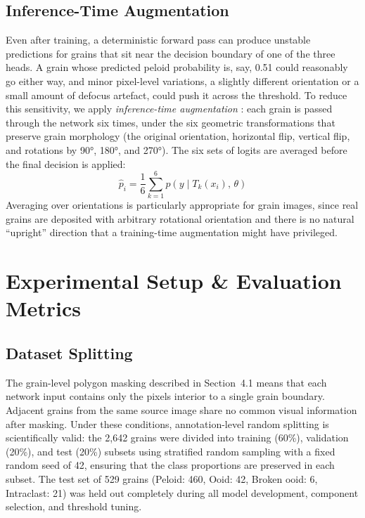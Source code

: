 \documentclass[a4paper,fleqn]{cas-dc}
\begin{document}
\subsection{Inference-Time Augmentation}
\label{sec:tta}
Even after training, a deterministic forward pass can produce unstable predictions for grains that sit near the decision boundary of one of the three heads. A grain whose predicted peloid probability is, say, 0.51 could reasonably go either way, and minor pixel-level variations, a slightly different orientation or a small amount of defocus artefact, could push it across the threshold. To reduce this sensitivity, we apply \textit{inference-time augmentation} \citep{shanmugam2021tta}: each grain is passed through the network six times, under the six geometric transformations that preserve grain morphology (the original orientation, horizontal flip, vertical flip, and rotations by 90°, 180°, and 270°). The six sets of logits are averaged before the final decision is applied:
\begin{equation}
\hat{p}_i = \frac{1}{6}\sum_{k=1}^{6} p\!\left(y \mid T_k(x_i),\, \theta\right)
\end{equation}
Averaging over orientations is particularly appropriate for grain images, since real grains are deposited with arbitrary rotational orientation and there is no natural ``upright'' direction that a training-time augmentation might have privileged.

\section{Experimental Setup \& Evaluation Metrics}

\subsection{Dataset Splitting}
The grain-level polygon masking described in Section~4.1 means that each network input contains only the pixels interior to a single grain boundary. Adjacent grains from the same source image share no common visual information after masking. Under these conditions, annotation-level random splitting is scientifically valid: the 2,642 grains were divided into training (60\%), validation (20\%), and test (20\%) subsets using stratified random sampling with a fixed random seed of 42, ensuring that the class proportions are preserved in each subset. The test set of 529 grains (Peloid: 460, Ooid: 42, Broken ooid: 6, Intraclast: 21) was held out completely during all model development, component selection, and threshold tuning.
\end{document}
